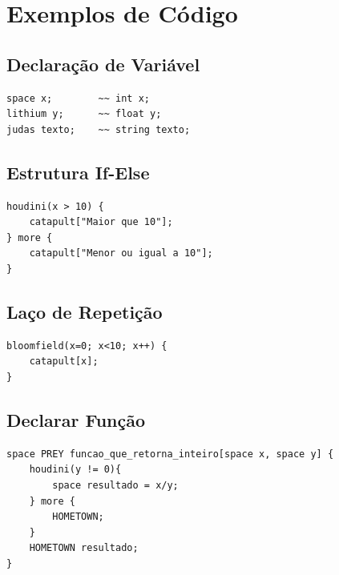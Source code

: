 \documentclass[a4paper,12pt]{article}
\begin{document}


\section{Exemplos de Código}
\subsection{Declaração de Variável}
\begin{lstlisting}[style=DharaStyle]
space x;        ~~ int x;
lithium y;      ~~ float y;
judas texto;    ~~ string texto;
\end{lstlisting}

\subsection{Estrutura If-Else}
\begin{lstlisting}[style=DharaStyle]
houdini(x > 10) {
    catapult["Maior que 10"];
} more {
    catapult["Menor ou igual a 10"];
}
\end{lstlisting}

\subsection{Laço de Repetição}
\begin{lstlisting}[style=DharaStyle]
bloomfield(x=0; x<10; x++) {
    catapult[x];
}
\end{lstlisting}

\subsection{Declarar Função}
\begin{lstlisting}[style=DharaStyle]
space PREY funcao_que_retorna_inteiro[space x, space y] {
    houdini(y != 0){
        space resultado = x/y;
    } more {
        HOMETOWN;
    }
    HOMETOWN resultado;
}
\end{lstlisting}
\end{document}
